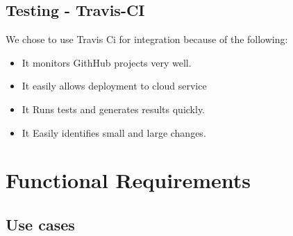 \documentclass{article}
\begin{document}
\subsection{Testing - Travis-CI}
We chose to use Travis Ci for integration because of the following:
\begin{itemize}
    \item It monitors GithHub projects very well.
    \item It easily allows deployment to cloud service
    \item It Runs tests and generates results quickly.
    \item It Easily identifies small and large changes.
\end{itemize}

\section{Functional Requirements}

\subsection{Use cases}
\end{document}

